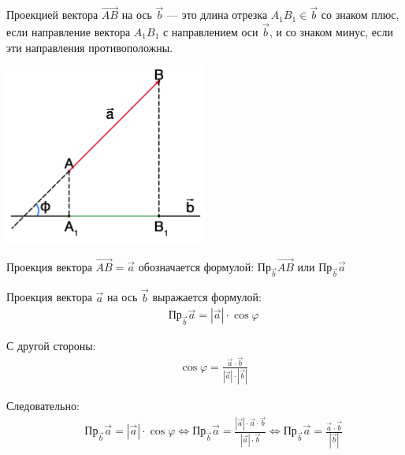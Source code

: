 \documentclass[12pt, fleqn]{extarticle}
\begin{document}
Проекцией вектора \(\overrightarrow{AB}\) на ось \(\overrightarrow{b}\) — это длина отрезка \(A_1B_1 \in \overrightarrow{b}\) со знаком плюс, если направление вектора \(A_1B_1\) с направлением оси \(\overrightarrow{b}\), и со знаком минус, если эти направления противоположны.

\begin{center}
    \includegraphics[width=0.5\textwidth]{projection.png}
\end{center}

Проекция вектора \(\overrightarrow{AB} = \overrightarrow{a}\) обозначается формулой: \(\text{Пр}_{\overrightarrow{b}}\overrightarrow{AB}\) или \(\text{Пр}_{\overrightarrow{b}}\overrightarrow{a}\)

Проекция вектора \(\overrightarrow{a}\) на ось \(\overrightarrow{b}\) выражается формулой:
\begin{align*}
     &  &
    \text{Пр}_{\overrightarrow{b}}\overrightarrow{a} = |\overrightarrow{a}| \cdot \cos{\varphi}
\end{align*}

С другой стороны:
\begin{align*}
     &  &
    \cos{\varphi} = \frac{\overrightarrow{a} \cdot \overrightarrow{b}}{|\overrightarrow{a}| \cdot |\overrightarrow{b}|}
\end{align*}

Следовательно:
\begin{align*}
     &  &
    \text{Пр}_{\overrightarrow{b}}\overrightarrow{a} = |\overrightarrow{a}| \cdot \cos{\varphi} \iff
    \text{Пр}_{\overrightarrow{b}}\overrightarrow{a} = \frac{|\overrightarrow{a}| \cdot \overrightarrow{a} \cdot \overrightarrow{b}}{|\overrightarrow{a}| \cdot \overrightarrow{b}} \iff
    \text{Пр}_{\overrightarrow{b}}\overrightarrow{a} =
    \frac{\overrightarrow{a} \cdot \overrightarrow{b}}{|\overrightarrow{b}|}
\end{align*}
\end{document}
